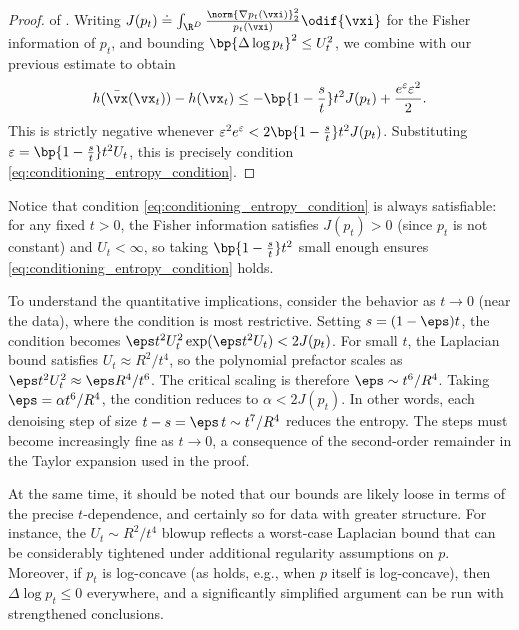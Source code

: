\documentclass[../../book-main.tex]{subfiles}
\begin{document}
\begin{proof}
    of . Writing \(J(p_{t})
    \doteq \int_{\R^{D}}\frac{\norm{\nabla
    p_{t}(\vxi)}_{2}^{2}}{p_{t}(\vxi)}\odif{\vxi}\) for the Fisher
    information of \(p_{t}\), and bounding \(\bp{\Delta \log
    p_{t}}^{2} \leq U_{t}^{2}\), we combine with our previous
    estimate to obtain
    \begin{equation}
        h(\bar{\vx}(\vx_{t})) - h(\vx_{t}) \leq -\bp{1 -
        \frac{s}{t}}t^{2}J(p_{t}) +
        \frac{e^{\varepsilon}\varepsilon^{2}}{2}.
    \end{equation}
    This is strictly negative whenever
    \(\varepsilon^{2}e^{\varepsilon} < 2\bp{1 -
    \frac{s}{t}}t^{2}J(p_{t})\). Substituting
    \(\varepsilon = \bp{1 - \frac{s}{t}}t^{2}U_{t}\), this is
    precisely condition
    \eqref{eq:conditioning_entropy_condition}.
\end{proof}

Notice that condition \eqref{eq:conditioning_entropy_condition}
is always satisfiable: for any fixed \(t > 0\), the Fisher
information satisfies \(J(p_{t}) > 0\) (since \(p_{t}\) is not
constant) and \(U_{t} < \infty\), so taking \(\bp{1 -
\frac{s}{t}}t^{2}\) small enough ensures
\eqref{eq:conditioning_entropy_condition} holds.

To understand the quantitative implications, consider the
behavior as \(t \to 0\) (near the data), where the condition is
most restrictive. Setting \(s = (1 - \eps)t\), the condition
becomes \(\eps t^{2}U_{t}^{2}\exp(\eps t^{2}U_{t}) <
2J(p_{t})\). For small \(t\), the Laplacian bound satisfies
\(U_{t} \approx R^{2}/t^{4}\), so the polynomial prefactor scales as
\(\eps t^{2}U_{t}^{2} \approx \eps R^{4}/t^{6}\). The
critical scaling is therefore
\(\eps \sim t^{6}/R^{4}\). Taking
\(\eps = \alpha t^{6}/R^{4}\),
the condition reduces to \(\alpha < 2J(p_{t})\). In other
words, each denoising step of size
\(t - s = \eps\, t \sim t^{7}/R^{4}\) reduces the entropy.
The steps must become increasingly fine as \(t \to 0\), a
consequence of the second-order remainder in the Taylor
expansion used in the proof.

At the same time, it should be noted that our bounds are likely loose in
terms of the precise \(t\)-dependence, and certainly so for data
with greater structure. For instance, the
\(U_{t} \sim R^{2}/t^{4}\) blowup reflects a worst-case
Laplacian bound that can be considerably tightened under
additional regularity assumptions on \(p\). Moreover, if
\(p_{t}\) is log-concave (as holds, e.g., when \(p\) itself is
log-concave), then \(\Delta \log p_{t} \leq 0\) everywhere, and a significantly
simplified argument can be run with strengthened conclusions.
\end{document}

